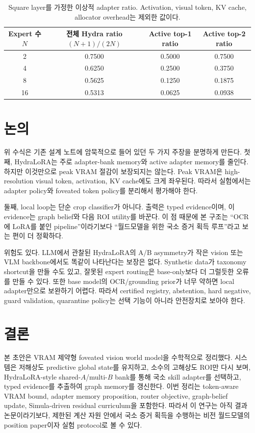 \documentclass[11pt]{article}
\theoremstyle{definition}
\begin{document}
\begin{table}[t]
  \centering
  \caption{Square layer를 가정한 이상적 adapter ratio. Activation, visual token, KV cache, allocator overhead는 제외한 값이다.}
  \label{tab:ratios-ko}
  \begin{tabular}{cccc}
    \toprule
    Expert 수 $N$ & 전체 Hydra ratio $(N+1)/(2N)$ & Active top-1 ratio & Active top-2 ratio \\
    \midrule
    2  & 0.7500 & 0.5000 & 0.7500 \\
    4  & 0.6250 & 0.2500 & 0.3750 \\
    8  & 0.5625 & 0.1250 & 0.1875 \\
    16 & 0.5313 & 0.0625 & 0.0938 \\
    \bottomrule
  \end{tabular}
\end{table}

\section{논의}

위 수식은 기존 설계 노트에 암묵적으로 들어 있던 두 가지 주장을 분명하게 만든다.
첫째, HydraLoRA는 주로 adapter-bank memory와 active adapter memory를 줄인다.
하지만 이것만으로 peak VRAM 절감이 보장되지는 않는다.
Peak VRAM은 high-resolution visual token, activation, KV cache에도 크게 좌우된다.
따라서 실험에서는 adapter policy와 foveated token policy를 분리해서 평가해야 한다.

둘째, local loop는 단순 crop classifier가 아니다.
출력은 typed evidence이며, 이 evidence는 graph belief와 다음 ROI utility를 바꾼다.
이 점 때문에 본 구조는 ``OCR에 LoRA를 붙인 pipeline''이라기보다 ``월드모델을 위한 국소 증거 획득 루프''라고 보는 편이 더 정확하다.

위험도 있다.
LLM에서 관찰된 HydraLoRA의 A/B asymmetry가 작은 vision 또는 VLM backbone에서도 똑같이 나타난다는 보장은 없다.
Synthetic data가 taxonomy shortcut을 만들 수도 있고, 잘못된 expert routing은 base-only보다 더 그럴듯한 오류를 만들 수 있다.
또한 base model의 OCR/grounding prior가 너무 약하면 local adapter만으로 보완하기 어렵다.
따라서 certified registry, abstention, hard negative, guard validation, quarantine policy는 선택 기능이 아니라 안전장치로 보아야 한다.

\section{결론}

본 초안은 VRAM 제약형 foveated vision world model을 수학적으로 정리했다.
시스템은 저해상도 predictive global state를 유지하고, 소수의 고해상도 ROI만 다시 보며, HydraLoRA-style shared-$A$/multi-$B$ bank를 통해 국소 skill adapter를 선택하고, typed evidence를 추출하여 graph memory를 갱신한다.
이번 정리는 token-aware VRAM bound, adapter memory proposition, router objective, graph-belief update, Simula-driven residual curriculum을 포함한다.
따라서 이 연구는 아직 결과 논문이라기보다, 제한된 계산 자원 안에서 국소 증거 획득을 수행하는 비전 월드모델의 position paper이자 실험 protocol로 볼 수 있다.



\end{document}
